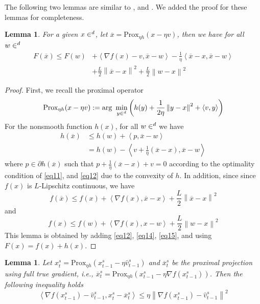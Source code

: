 \documentclass[iicol,sn-basic]{sn-jnl}
\theoremstyle{thmstyleone}%
\theoremstyle{thmstyletwo}%
\theoremstyle{thmstylethree}%
\let\R\relax
\newcommand*{\R}{\mathbb{R}}
\newcommand*{\Po}{\text{Prox}}
\newcommand{\norm}[1]{\left\lVert#1\right\rVert}
\newcommand{\Iprod}[2]{\left\langle #1,#2\right\rangle}
\newtheorem{lemma}[theorem]{Lemma}
\begin{document}
The following two lemmas are similar to \cite[Lemma 1, Lemma 2]{reddi2016proximal}, \cite[Lemma 1, Proposition 1]{ghadimi2013stochastic} and \cite[Lemma 1, Lemma 2]{li2018simple}.
We added the proof for these lemmas for completeness. 
\begin{lemma}\label{lemma1}
For a given $x \in \R^d$, let $\overline{x} = \Po_{\eta h}(x-\eta v)$, then we have for all $w\in \R^d$
\begin{equation}\label{eq10}
\begin{split}
F(\overline{x}) \leq F(w) &+ \Iprod{\nabla f(x)-v}{\overline{x}-w}-\frac{1}{\eta} \Iprod{\overline{x}-x}{\overline{x}-w}\\
&+\frac{L}{2}\norm{\overline{x}-x}^2+\frac{L}{2}\norm{w-x}^2 
\end{split}
\end{equation}
\end{lemma}
\begin{proof}
First, we recall the proximal operator 
\begin{equation}\label{eq11}
\Po_{\eta h}(x-\eta v) := \text{arg}\,\,\min_{y\in\R^d}\left(h(y)+\frac{1}{2\eta}\norm{y-x}^2+\Iprod{v}{y}\right)
\end{equation}
For the nonsmooth function $h(x)$, for all $w\in\R^d$ we have 
\begin{equation}\label{eq12}
\begin{split}
h(\overline{x}) &\leq h(w) + \Iprod{p}{\overline{x}-w}\\
&= h(w) - \Iprod{v+\frac{1}{\eta}(\overline{x}-x)}{\overline{x}-w}
\end{split}
\end{equation}
where $p\in \partial h(\overline{x})$ such that $p+\frac{1}{\eta}(\overline{x}-x)+v = 0$ according to the optimality condition of \eqref{eq11}, and \eqref{eq12} due to the convexity of $h$. In addition, since since $f(x)$ is $L$-Lipschitz continuous, we have
\begin{equation}\label{eq14}
f(\overline{x}) \leq f(x)+\Iprod{\nabla f(x)}{\overline{x}-x}+\frac{L}{2}\norm{\overline{x}-x}^2
\end{equation}
and
\begin{equation}\label{eq15}
f(x) \leq f(w)+\Iprod{\nabla f(x)}{x-w}+\frac{L}{2}\norm{w-x}^2
\end{equation}
 This lemma is obtained by adding \eqref{eq12}, \eqref{eq14}, \eqref{eq15}, and using $F(x) = f(x)+h(x)$. 
\end{proof}
\begin{lemma}\label{lemm-est-grad}
Let  $x_{t}^s= \Po_{\eta h}(x_{t-1}^s - \eta \hat{v}_{t-1}^s)$ and $\overline{x}_{t}^s$ be the proximal projection using full true gradient, i.e., $\overline{x}_{t}^s= \Po_{\eta h}(x_{t-1}^s - \eta \nabla f(x_{t-1}^s))$. Then the following inequality holds
\[
\Iprod{\nabla f(x_{t-1}^s) -\hat{v}_{t-1}^s}{x_t^s -\overline{x}_t^s} \leq \eta\norm{\nabla f(x_{t-1}^s)-\hat{v}_{t-1}^s}^2
\]
\end{lemma}
\end{document}

